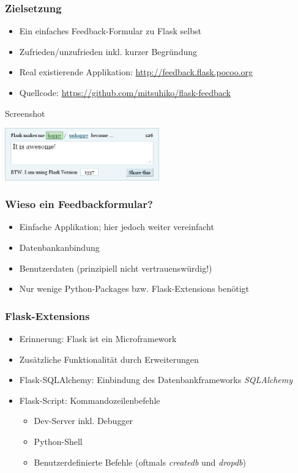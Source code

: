 \documentclass{beamer}
\begin{document}
\begin{frame}
  \frametitle{Zielsetzung}
  \begin{itemize}
    \item Ein einfaches Feedback-Formular zu Flask selbst
    \item Zufrieden/unzufrieden inkl. kurzer Begründung
    \item Real existierende Applikation: \url{http://feedback.flask.pocoo.org}
    \item Quellcode: \url{https://github.com/mitsuhiko/flask-feedback}
  \end{itemize}

  \begin{exampleblock}{Screenshot}
    \begin{center}
      \includegraphics[width=0.5\textwidth]{images/flask-feedback.png}
    \end{center}
  \end{exampleblock}
\end{frame}

\begin{frame}
  \frametitle{Wieso ein Feedbackformular?}
  \begin{itemize}
    \item Einfache Applikation; hier jedoch weiter vereinfacht
    \item Datenbankanbindung
    \item Benutzerdaten (prinzipiell nicht vertrauenswürdig!)
    \item Nur wenige Python-Packages bzw. Flask-Extensions benötigt
  \end{itemize}
\end{frame}

\begin{frame}
  \frametitle{Flask-Extensions}
  \begin{itemize}
    \item Erinnerung: Flask ist ein Microframework
    \item Zusätzliche Funktionalität durch Erweiterungen
    \item Flask-SQLAlchemy: Einbindung des Datenbankframeworks \emph{SQLAlchemy}
    \item Flask-Script: Kommandozeilenbefehle
    \begin{itemize}
      \item Dev-Server inkl. Debugger
      \item Python-Shell
      \item Benutzerdefinierte Befehle (oftmals \emph{createdb} und \emph{dropdb})
    \end{itemize}
  \end{itemize}
\end{frame}
\end{document}

